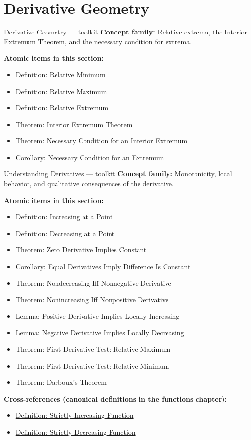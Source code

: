 \section{Derivative Geometry}

\begin{toolkitbox}{Derivative Geometry --- toolkit}
\textbf{Concept family:} Relative extrema, the Interior Extremum Theorem, and the necessary condition for extrema.

\medskip
\textbf{Atomic items in this section:}
\begin{itemize}
  \item Definition: Relative Minimum
  \item Definition: Relative Maximum
  \item Definition: Relative Extremum
  \item Theorem: Interior Extremum Theorem
  \item Theorem: Necessary Condition for an Interior Extremum
  \item Corollary: Necessary Condition for an Extremum
\end{itemize}
\end{toolkitbox}

\begin{toolkitbox}{Understanding Derivatives --- toolkit}
\textbf{Concept family:} Monotonicity, local behavior, and qualitative consequences of the derivative.

\medskip
\textbf{Atomic items in this section:}
\begin{itemize}
  \item Definition: Increasing at a Point
  \item Definition: Decreasing at a Point
  \item Theorem: Zero Derivative Implies Constant
  \item Corollary: Equal Derivatives Imply Difference Is Constant
  \item Theorem: Nondecreasing Iff Nonnegative Derivative
  \item Theorem: Nonincreasing Iff Nonpositive Derivative
  \item Lemma: Positive Derivative Implies Locally Increasing
  \item Lemma: Negative Derivative Implies Locally Decreasing
  \item Theorem: First Derivative Test: Relative Maximum
  \item Theorem: First Derivative Test: Relative Minimum
  \item Theorem: Darboux's Theorem
\end{itemize}

\medskip
\textbf{Cross-references (canonical definitions in the functions chapter):}
\begin{itemize}
  \item \hyperref[def:function-strictly-increasing]{Definition: Strictly Increasing Function}
  \item \hyperref[def:function-strictly-decreasing]{Definition: Strictly Decreasing Function}
\end{itemize}
\end{toolkitbox}



